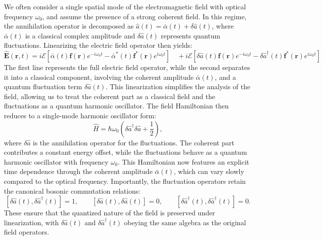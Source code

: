 We often consider a single spatial mode of the electromagnetic field with optical frequency \(\omega_0\), and assume the presence of a strong coherent field. In this regime, the annihilation operator is decomposed as \(\hat{a}(t) = \bar{\alpha}(t) + \delta\hat{a}(t)\), where \(\bar{\alpha}(t)\) is a classical complex amplitude and \(\delta\hat{a}(t)\) represents quantum fluctuations.
Linearizing the electric field operator then yields:
\begin{equation}
\hat{\mathbf{E}}(\mathbf{r}, t) = i \mathcal{E} \left[ \bar{\alpha}(t) \mathbf{f}(\mathbf{r}) e^{-i\omega_0 t} 
- \bar{\alpha}^*(t) \mathbf{f}^*(\mathbf{r}) e^{i\omega_0 t} \right] \quad + i \mathcal{E} \left[ \delta\hat{a}(t) \mathbf{f}(\mathbf{r}) e^{-i\omega_0 t} - \delta\hat{a}^\dagger(t) \mathbf{f}^*(\mathbf{r}) e^{i\omega_0 t} \right]
\end{equation}
The first line represents the full electric field operator, while the second separates it into a classical component, involving the coherent amplitude $\bar{\alpha}(t)$, and a quantum fluctuation term $\delta\hat{a}(t)$. This linearization simplifies the analysis of the field, allowing us to treat the coherent part as a classical field and the fluctuations as a quantum harmonic oscillator. The field Hamiltonian then reduces to a single-mode harmonic oscillator form:
\begin{equation}
\hat{H} = \hbar \omega_0 \left( \delta \hat{a}^\dagger \delta \hat{a} + \frac{1}{2} \right),
\end{equation}
where $\delta \hat{a}$ is the annihilation operator for the fluctuations. The coherent part contributes a constant energy offset, while the fluctuations behave as a quantum harmonic oscillator with frequency $\omega_0$. This Hamiltonian now features an explicit time dependence through the coherent amplitude $\bar{\alpha}(t)$, which can vary slowly compared to the optical frequency.
Importantly, the fluctuation operators retain the canonical bosonic commutation relations:
\[
[\delta \hat{a}(t), \delta \hat{a}^\dagger(t)] = 1, \qquad
[\delta \hat{a}(t), \delta \hat{a}(t)] = 0, \qquad
[\delta \hat{a}^\dagger(t), \delta \hat{a}^\dagger(t)] = 0.
\]
These ensure that the quantized nature of the field is preserved under linearization, with $\delta \hat{a}(t)$ and $\delta \hat{a}^\dagger(t)$ obeying the same algebra as the original field operators. \\

